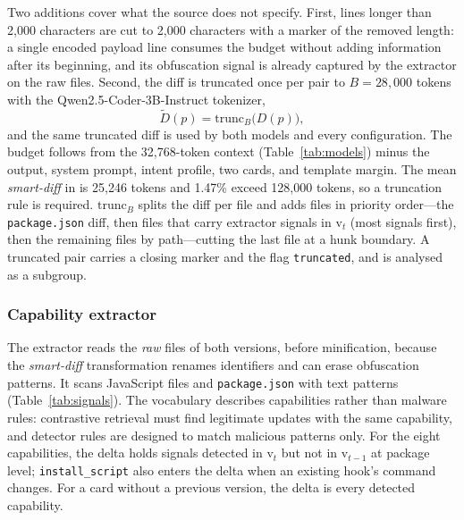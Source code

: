 \documentclass[a4paper,fleqn]{cas-dc}
\begin{document}
Two additions cover what the source does not specify. First, lines longer
than 2{,}000 characters are cut to 2{,}000 characters with a marker of the
removed length: a single encoded payload line consumes the budget without
adding information after its beginning, and its obfuscation signal is already
captured by the extractor on the raw files. Second, the diff is truncated once
per pair to $B = 28{,}000$ tokens with the Qwen2.5-Coder-3B-Instruct
tokenizer,
\begin{equation}
\tilde{D}(p) = \mathrm{trunc}_B\bigl(D(p)\bigr),
\label{eq:trunc}
\end{equation}
and the same truncated diff is used by both models and every configuration.
The budget follows from the 32{,}768-token context (Table~\ref{tab:models})
minus the output, system prompt, intent profile, two cards, and template
margin. The mean \emph{smart-diff} in \citet{wyss2025evaluating} is 25{,}246
tokens and 1.47\% exceed 128{,}000 tokens, so a truncation rule is required.
$\mathrm{trunc}_B$ splits the diff per file and adds files in priority
order---the \texttt{package.json} diff, then files that carry extractor
signals in $\mathrm{v}_t$ (most signals first), then the remaining files by
path---cutting the last file at a hunk boundary. A truncated pair carries a
closing marker and the flag \texttt{truncated}, and is analysed as a subgroup.

\subsubsection{Capability extractor}\label{sec:extractor}

The extractor reads the \emph{raw} files of both versions, before
minification, because the \emph{smart-diff} transformation renames
identifiers and can erase obfuscation patterns. It scans JavaScript files and
\texttt{package.json} with text patterns (Table~\ref{tab:signals}). The
vocabulary describes capabilities rather than malware rules: contrastive
retrieval must find legitimate updates with the same capability, and detector
rules are designed to match malicious patterns only. For the eight
capabilities, the delta holds signals detected in $\mathrm{v}_t$ but not in
$\mathrm{v}_{t-1}$ at package level; \texttt{install\_script} also enters the
delta when an existing hook's command changes. For a card without a previous
version, the delta is every detected capability.
\end{document}
